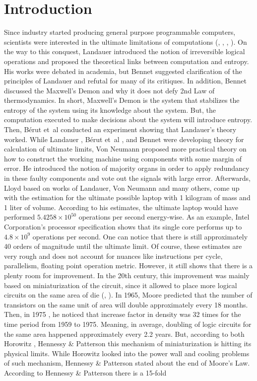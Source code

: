 \documentclass[conference]{IEEEtran}
\begin{document}
\section{Introduction}
Since industry started producing general purpose programmable computers, scientists were interested in the ultimate limitations of computations (\cite{ref17}, \cite{ref22}, \cite{ref23}, \cite{ref24}). On the way to this conquest, Landauer \cite{ref22} introduced the notion of irreversible logical operations and proposed the theoretical links between computation and entropy. His works were debated in academia, but Bennet \cite{ref24} suggested clarification of the principles of Landauer and refutal for many of its critiques. In addition, Bennet discussed the Maxwell's Demon and why it does not defy 2nd Law of thermodynamics. In short, Maxwell's Demon is the system that stabilizes the entropy of the system using its knowledge about the system. But, the computation executed to make decisions about the system will introduce entropy. Then, B{\'e}rut et~al \cite{ref23} conducted an experiment showing that Landauer's theory worked. While Landauer \cite{ref22}, B{\'e}rut et~al \cite{ref23}, and Bennet \cite{ref24} were developing theory for calculation of ultimate limits, Von Neumann \cite{ref16} proposed more practical theory on how to construct the working machine using components with some margin of error. He introduced the notion of majority organs in order to apply redundancy in these faulty components and vote out the signals with large error. Afterwards, Lloyd \cite{ref17} based on works of Landauer, Von Neumann and many others, come up with the estimation for the ultimate possible laptop with 1 kilogram of mass and 1 liter of volume. According to his estimates, the ultimate laptop would have performed $5.4258 \times 10^{50}$ operations per second energy-wise. As an example, Intel Corporation's \cite{ref25} processor specification shows that its single core performs up to $4.8 \times 10^{9}$ operations per second. One can notice that there is still approximately 40 orders of magnitude until the ultimate limit. Of course, these estimates are very rough and does not account for nuances like instructions per cycle, parallelism, floating point operation metric. However, it still shows that there is a plenty room for improvement. In the 20th century, this improvement was mainly based on miniaturization of the circuit, since it allowed to place more logical circuits on the same area of die (\cite{ref18}, \cite{ref19}). In 1965, Moore \cite{ref18} predicted that the number of transistors on the same unit of area will double approximately every 18 months. Then, in 1975 \cite{ref19}, he noticed that increase factor in density was 32 times for the time period from 1959 to 1975. Meaning, in average, doubling of logic circuits for the same area happened approximately every 2.2 years. But, according to both Horowitz \cite{ref20}, Hennessy \& Patterson \cite{ref21} this mechanism of miniaturization is hitting its physical limits. While Horowitz \cite{ref20} looked into the power wall and cooling problems of such mechanism, Hennessy \& Patterson \cite{ref21} stated about the end of Moore's Law. According to Hennessy \& Patterson \cite{ref21} there is a 15-fold 
\end{document}
